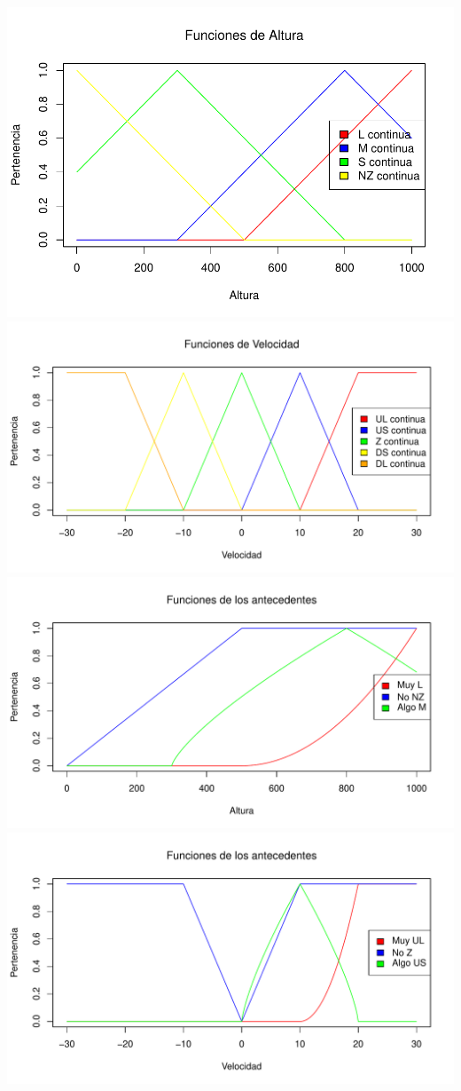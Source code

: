 \documentclass[
]{article}
\begin{document}
\includegraphics{tareaBloque3_files/figure-latex/unnamed-chunk-11-1.pdf}
\includegraphics{tareaBloque3_files/figure-latex/unnamed-chunk-12-1.pdf}
\includegraphics{tareaBloque3_files/figure-latex/unnamed-chunk-13-1.pdf}
\includegraphics{tareaBloque3_files/figure-latex/unnamed-chunk-13-2.pdf}
\end{document}
